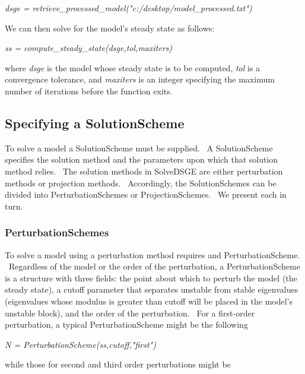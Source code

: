 \documentclass[notitlepage,11pt]{article}
\begin{document}
\bigskip 

\textit{dsge = retrieve\_processed\_model("c:/desktop/model\_processed.txt")}

\bigskip 

We can then solve for the model's steady state as follows:

\bigskip

\textit{ss = compute\_steady\_state(dsge,tol,maxiters)}

\bigskip

where \textit{dsge} is the model whose steady state is to be computed, 
\textit{tol} is a convergence tolerance, and \textit{maxiters} is an integer
specifying the maximum number of iterations before the function exits.

\subsection{Specifying a SolutionScheme}

To solve a model a SolutionScheme must be supplied. \ A SolutionScheme
specifies the solution method and the parameters upon which that solution
method relies. \ The solution methods in SolveDSGE are either perturbation
methods or projection methods. \ Accordingly, the SolutionSchemes can be
divided into PerturbationSchemes or ProjectionSchemes. \ We present each in
turn.

\subsubsection{PerturbationSchemes}

To solve a model using a perturbation method requires and
PerturbationScheme. \ Regardless of the model or the order of the
perturbation, a PerturbationScheme is a structure with three fields: the
point about which to perturb the model (the steady state), a cutoff
parameter that separates unstable from stable eigenvalues (eigenvalues whose
modulus is greater than cutoff will be placed in the model's unstable
block), and the order of the perturbation. \ For a first-order perturbation,
a typical PerturbationScheme might be the following

\bigskip

\textit{N = PerturbationScheme(ss,cutoff,"first")}

\bigskip

while those for second and third order perturbations might be

\bigskip
\end{document}
